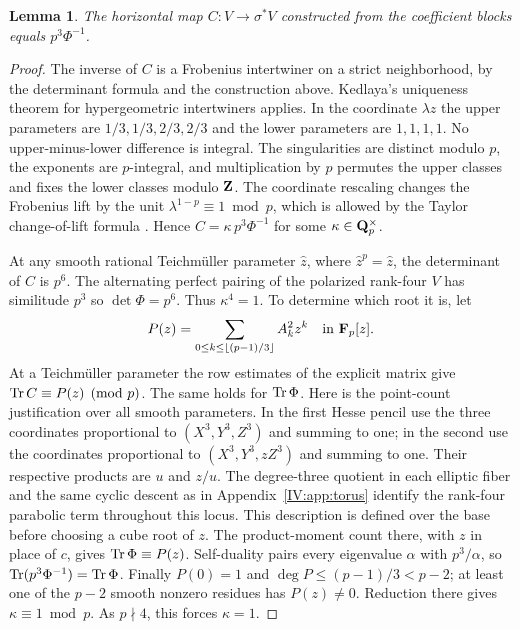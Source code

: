 \documentclass[11pt,letterpaper]{article}
\newtheorem{lemma}[theorem]{Lemma}
\theoremstyle{definition}
\theoremstyle{remark}
\begin{document}
\begin{lemma}\label{IV:lem:normal}
The horizontal map $C:V\longrightarrow\sigma^*V$ constructed from
the coefficient blocks equals $p^3\Phi^{-1}$.
\end{lemma}
\begin{proof}
The inverse of $C$ is a Frobenius intertwiner on a strict
neighborhood, by the determinant formula and the construction above.
Kedlaya's uniqueness theorem for hypergeometric intertwiners
\cite[Lemma~2.3.6 and Remark~4.1.3]{IV:kedlaya} applies. In the
coordinate $\lambda z$ the upper parameters are $1/3,1/3,2/3,2/3$
and the lower parameters are $1,1,1,1$. No upper-minus-lower
difference is integral. The singularities are distinct modulo $p$,
the exponents are $p$-integral, and multiplication by $p$ permutes
the upper classes and fixes the lower classes modulo $\mathbf Z$. The
coordinate rescaling changes the Frobenius lift by the unit
$\lambda^{1-p}\equiv1\bmod p$, which is allowed by the Taylor
change-of-lift formula \cite[Remark~2.3.7]{IV:kedlaya}. Hence
$C=\kappa\,p^3\Phi^{-1}$ for some $\kappa\in\mathbf Q_p^\times$.

At any smooth rational Teichm\"uller parameter $\widehat z$, where
$\widehat z^p=\widehat z$, the determinant of $C$ is $p^6$.
The alternating perfect pairing of the polarized rank-four $V$ has
similitude $p^3$ so $\det\Phi=p^6$. Thus $\kappa^4=1$.
To determine which root it is, let
\[
 P(z)=\sum_{0\le k\le\lfloor(p-1)/3\rfloor} A_k^2 z^k\quad\text{in }\mathbf F_p[z].
\]
At a Teichm\"uller parameter the row estimates of the explicit matrix
give $\operatorname{Tr} C\equiv P(z)\pmod p$. The same holds for $\operatorname{Tr}\Phi$.
Here is the point-count justification over all smooth parameters.
In the first Hesse pencil use the three coordinates proportional to
$(X^3,Y^3,Z^3)$ and summing to one; in the second use the coordinates
proportional to $(X^3,Y^3,z Z^3)$ and summing to one. Their respective
products are $u$ and $z/u$. The degree-three quotient in each
elliptic fiber and the same cyclic descent as in
Appendix~\ref{IV:app:torus} identify the rank-four parabolic term
throughout this locus. This description is defined over the base
before choosing a cube root of $z$.
The product-moment count there, with $z$ in place of $c$, gives
$\operatorname{Tr}\Phi\equiv P(z)$. Self-duality pairs every eigenvalue
$\alpha$ with $p^3/\alpha$, so $\operatorname{Tr}(p^3\Phi^{-1})=\operatorname{Tr}\Phi$.
Finally $P(0)=1$ and $\deg P\le(p-1)/3<p-2$; at least one of the
$p-2$ smooth nonzero residues has $P(z)\ne0$. Reduction there gives
$\kappa\equiv1\bmod p$. As $p\nmid4$, this forces $\kappa=1$.
\end{proof}
\end{document}
